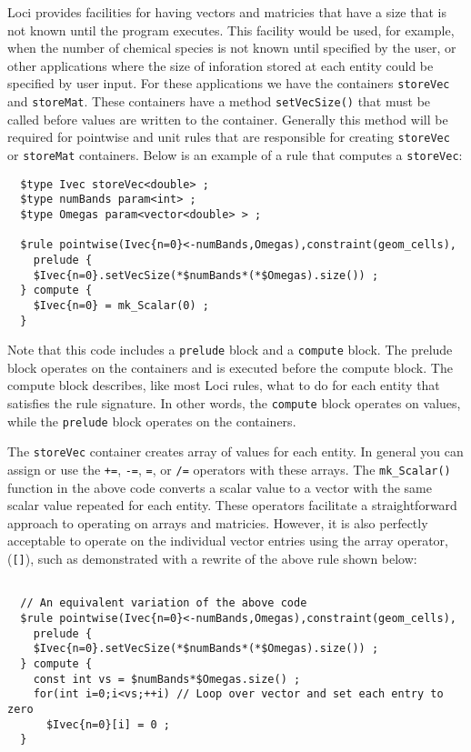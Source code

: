 \documentclass[10pt,epsf,letterpaper,twoside]{book}
\begin{document}
Loci provides facilities for having vectors and matricies that have a
size that is not known until the program executes.  This facility
would be used, for example, when the number of chemical species is not
known until specified by the user, or other applications where the
size of inforation stored at each entity could be specified by user
input.  For these applications we have the containers {\tt storeVec}
and {\tt storeMat}.  These containers have a method {\tt setVecSize()}
that must be called before values are written to the container.
Generally this method will be required for pointwise and unit rules
that are responsible for creating {\tt storeVec} or {\tt storeMat}
containers.  Below is an example of a rule that computes a {\tt storeVec}:
\begin{verbatim}
  $type Ivec storeVec<double> ;
  $type numBands param<int> ;
  $type Omegas param<vector<double> > ;

  $rule pointwise(Ivec{n=0}<-numBands,Omegas),constraint(geom_cells),
    prelude {
    $Ivec{n=0}.setVecSize(*$numBands*(*$Omegas).size()) ;
  } compute {
    $Ivec{n=0} = mk_Scalar(0) ;
  }
\end{verbatim}
Note that this code includes a {\tt prelude} block and a {\tt compute}
block.  The prelude block operates on the containers and is executed
before the compute block.  The compute block describes, like most Loci
rules, what to do for each entity that satisfies the rule signature.
In other words, the {\tt compute} block operates on values, while the
{\tt prelude} block operates on the containers.

The {\tt storeVec} container creates array of values for each entity.
In general you can assign or use the {\tt +=}, {\tt-=}, {\tt \*=}, or
{\tt /=} operators with these arrays.  The {\tt mk\_Scalar()} function in
the above code converts a scalar value to a vector with the same
scalar value repeated for each entity.  These operators facilitate a
straightforward approach to operating on arrays and matricies.
However, it is also perfectly acceptable to operate on the individual
vector entries using the array operator, ({\tt []}), such as
demonstrated with a rewrite of the above rule shown below:
\begin{verbatim}

  // An equivalent variation of the above code
  $rule pointwise(Ivec{n=0}<-numBands,Omegas),constraint(geom_cells),
    prelude {
    $Ivec{n=0}.setVecSize(*$numBands*(*$Omegas).size()) ;
  } compute {
    const int vs = $numBands*$Omegas.size() ;
    for(int i=0;i<vs;++i) // Loop over vector and set each entry to zero
      $Ivec{n=0}[i] = 0 ;
  }
\end{verbatim}
\end{document}
